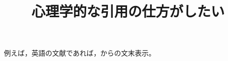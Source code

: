 \documentclass[uplatex,a4paper,11pt]{jsarticle}
\begin{document}
\title{心理学的な引用の仕方がしたい}

例えば，英語の文献であれば，\citet{越智2013}からの文末表示\citep{Blechman1990}。


%


\nocite{*}
\end{document}
